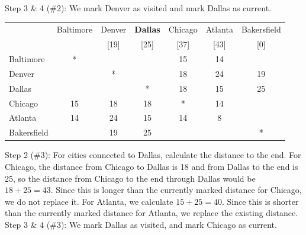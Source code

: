 \begin{example}{}{}
\noindent Step 3 \& 4 (\#2):  We mark Denver as visited and mark Dallas as current.
 \begin{center}
 \begin{tabular}{|l|c|c|c|c|c|c|}
 \hline
 & Baltimore & \cellcolor{yellow}Denver & \textbf{Dallas} & Chicago & Atlanta & \cellcolor{yellow}Bakersfield\\
 && \cellcolor{yellow}[19]&[25]&[37]&[43]&\cellcolor{yellow}[0]\\
 \hline
 Baltimore & * & \cellcolor{yellow}&&15&14&\cellcolor{yellow}\\
 \hline
  \cellcolor{yellow}Denver & \cellcolor{yellow}& \cellcolor{yellow}*& \cellcolor{yellow}& \cellcolor{yellow}18& \cellcolor{yellow}24&\cellcolor{yellow}19\\
 \hline
Dallas&& \cellcolor{yellow}&*&18&15&\cellcolor{yellow}25\\
 \hline
 Chicago &15& \cellcolor{yellow}18&18&*&14&\cellcolor{yellow}\\
 \hline
 Atlanta & 14 &  \cellcolor{yellow}24&15&14&8&\cellcolor{yellow}\\
 \hline
 \cellcolor{yellow}Bakersfield &\cellcolor{yellow}&\cellcolor{yellow}19&\cellcolor{yellow}25&\cellcolor{yellow}&\cellcolor{yellow}&\cellcolor{yellow}*\\
 \hline
 \end{tabular}
 \end{center}



\noindent Step 2 (\#3):  For cities connected to Dallas, calculate the distance to the end.  For Chicago, the distance from Chicago to Dallas is 18 and from Dallas to the end is 25, so the distance from Chicago to the end through Dallas would be $18+25 = 43$.  Since this is longer than the currently marked distance for Chicago, we do not replace it.  For Atlanta, we calculate $15+25 = 40$.  Since this is shorter than the currently marked distance for Atlanta, we replace the existing distance.\\

\noindent Step 3 \& 4 (\#3):  We mark Dallas as visited, and mark Chicago as current.


\end{example}
